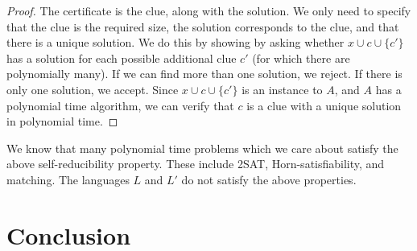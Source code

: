 \documentclass[runningheads,a4paper]{llncs}
\begin{document}
\begin{proof}
The certificate is the clue, along with the solution. We only need to specify that the clue is the required size, the solution corresponds to the clue, and that there is a unique solution. We do this by showing by asking whether $x \cup c \cup \{ c' \}$ has a solution for each possible additional clue $c'$ (for which there are polynomially many). If we can find more than one solution, we reject. If there is only one solution, we accept. Since $x \cup c \cup \{ c' \}$ is an instance to $A$, and $A$ has a polynomial time algorithm, we can verify that $c$ is a clue with a unique solution in polynomial time.
\end{proof}

We know that many polynomial time problems which we care about satisfy the above self-reducibility property. These include 2SAT, Horn-satisfiability, and matching. The languages $L$ and $L'$ do not satisfy the above properties.

\section{Conclusion}
\label{sec:conclusion}




\end{document}
